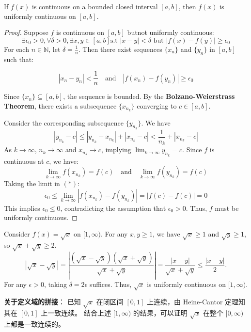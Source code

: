 \documentclass[
	UTF-8,
	11pt, %
	a4paper, %
]{LegrandOrangeBook}
\begin{document}
    \newpage

    \begin{theorem}
    If $f(x)$ is continuous on a bounded closed interval $[a, b]$, then $f(x)$ is uniformly continuous on $[a, b]$.
    \end{theorem}

    \begin{proof}
    Suppose $f$ is continuous on $[a, b]$ butnot uniformly continuous:
    \[ \exists \epsilon_0 > 0, \forall \delta > 0, \exists x, y \in [a, b] \text{s.t } |x - y| < \delta \text{ but } |f(x) - f(y)| \ge \epsilon_0 \]
    For each $n \in \mathbb{N}$, let $\delta = \frac{1}{n}$. 
    Then there exist sequences $\{x_n\}$ and $\{y_n\}$ in $[a, b]$ such that:

    \[ |x_n - y_n| < \frac{1}{n} \quad \text{and} \quad |f(x_n) - f(y_n)| \ge \epsilon_0 \tag*{$(*)$}\]

    Since $\{x_n\} \subseteq [a, b]$, the sequence is bounded. 
    By the \textbf{Bolzano-Weierstrass Theorem}, 
    there exists a subsequence $\{x_{n_k}\}$ converging to $c \in [a, b]$.

    
    Consider the corresponding subsequence $\{y_{n_k}\}$. We have
    \[ |y_{n_k} - c| \le |y_{n_k} - x_{n_k}| + |x_{n_k} - c| < \frac{1}{n_k} + |x_{n_k} - c| \]
    As $k \to \infty$, $n_k \to \infty$ and $x_{n_k} \to c$, implying $\lim_{k \to \infty} y_{n_k} = c$.
    Since $f$ is continuous at $c$, we have:
    \[ \lim_{k \to \infty} f(x_{n_k}) = f(c) \quad \text{and} \quad \lim_{k \to \infty} f(y_{n_k}) = f(c) \]
    Taking the limit in $(*)$:
    \[ \epsilon_0 \le \lim_{k \to \infty} |f(x_{n_k}) - f(y_{n_k})| = |f(c) - f(c)| = 0 \]
    This implies $\epsilon_0 \le 0$, contradicting the assumption that $\epsilon_0 > 0$.
    Thus, $f$ must be uniformly continuous.
    \end{proof}


    \begin{example}
    Consider $f(x) = \sqrt{x}$ on $[1, \infty)$.
    For any $x, y \ge 1$, we have $\sqrt{x} \ge 1$ and $\sqrt{y} \ge 1$, so $\sqrt{x} + \sqrt{y} \ge 2$.
    \[ |\sqrt{x} - \sqrt{y}| = \left| \frac{(\sqrt{x} - \sqrt{y})(\sqrt{x} + \sqrt{y})}{\sqrt{x} + \sqrt{y}} \right| = \frac{|x - y|}{\sqrt{x} + \sqrt{y}} \le \frac{|x - y|}{2}. \]
    For any $\epsilon > 0$, taking $\delta = 2\epsilon$ suffices. Thus, $\sqrt{x}$ is uniformly continuous on $[1, \infty)$.

    \begin{remark}
    \textbf{关于定义域的拼接}：
    已知 $\sqrt{x}$ 在闭区间 $[0, 1]$ 上连续，由 Heine-Cantor 定理知其在 $[0, 1]$ 上一致连续。
    结合上述 $[1, \infty)$ 的结果，可以证明 $\sqrt{x}$ 在整个 $[0, \infty)$ 上都是一致连续的。
    \end{remark}
    \end{example}
\end{document}
